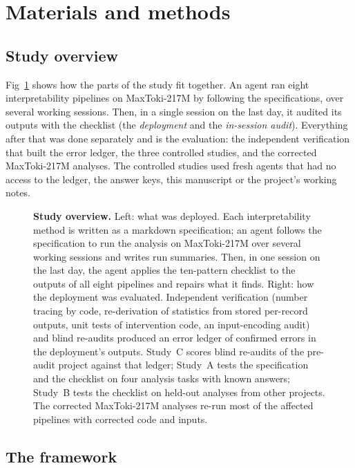 \documentclass[10pt,letterpaper]{article}
\begin{document}
\section*{Materials and methods}

\subsection*{Study overview}
Fig~\ref{fig:overview} shows how the parts of the study fit together. An
agent ran eight interpretability pipelines on MaxToki-217M by following
the specifications, over several working sessions. Then, in a single
session on the last day, it audited its outputs with the checklist (the
\emph{deployment} and the \emph{in-session audit}). Everything after that was done separately and is the evaluation:
the independent verification that built the error ledger, the three
controlled studies, and the corrected MaxToki-217M analyses. The
controlled studies used fresh agents that had no access to the ledger,
the answer keys, this manuscript or the project's working notes.

\begin{figure}[H]
\caption{\textbf{Study overview.} Left: what was deployed. Each
interpretability method is written as a markdown specification; an agent
follows the specification to run the analysis on MaxToki-217M over
several working sessions and writes run summaries. Then, in one session
on the last day, the agent applies the ten-pattern checklist to the
outputs of all eight pipelines and repairs what it finds. Right: how the deployment was
evaluated. Independent verification (number tracing by code,
re-derivation of statistics from stored per-record outputs, unit tests of
intervention code, an input-encoding audit) and blind re-audits produced
an error ledger of confirmed errors in the deployment's outputs.
Study~C scores blind re-audits of the pre-audit project against that
ledger; Study~A tests the specification and the checklist on four
analysis tasks with known answers; Study~B tests the checklist on held-out
analyses from other projects. The corrected MaxToki-217M analyses re-run
most of the affected pipelines with corrected code and inputs.}
\label{fig:overview}
\end{figure}

\subsection*{The framework}
\end{document}
